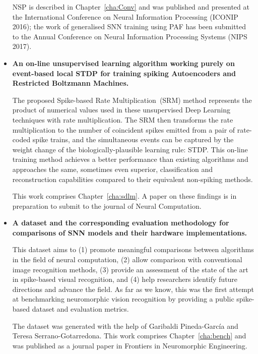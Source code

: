 \begin{itemize}
	NSP is described in Chapter~\ref{cha:Conv} and was published and presented at the International Conference on Neural Information Processing (ICONIP 2016);
	the work of generalised SNN training using PAF has been submitted to the Annual Conference on Neural Information Processing Systems (NIPS 2017).

	\item 
	\textbf{An on-line unsupervised learning algorithm working purely on event-based local STDP for training spiking Autoencoders and Restricted Boltzmann Machines.}
	
	The proposed Spike-based Rate Multiplication~(SRM) method represents the product of numerical values used in these unsupervised Deep Learning techniques with rate multiplication.
	The SRM then transforms the rate multiplication to the number of coincident spikes emitted from a pair of rate-coded spike trains, and the simultaneous events can be captured by the weight change of the biologically-plausible learning rule: STDP.
	This on-line training method achieves a better performance than existing algorithms and approaches the same, sometimes even superior, classification and reconstruction capabilities compared to their equivalent non-spiking methods.
%	
	
	This work comprises Chapter~\ref{cha:sdlm}.
	A paper on these findings is in preparation to submit to the journal of Neural Computation.
	
	\item 
	\textbf{A dataset and the corresponding evaluation methodology for comparisons of SNN models and their hardware implementations.}
	
	This dataset aims to (1) promote meaningful comparisons between algorithms in the field of neural computation, (2) allow comparison with conventional image recognition methods, (3) provide an assessment of the state of the art in spike-based visual recognition, and (4) help researchers identify future directions and advance the field.
	As far as we know, this was the first attempt at benchmarking neuromorphic vision recognition by providing a public spike-based dataset and evaluation metrics.
	
	The dataset was generated with the help of Garibaldi Pineda-Garc\'ia and Teresa Serrano-Gotarredona.
	This work comprises Chapter~\ref{cha:bench} and was published as a journal paper in Frontiers in Neuromorphic Engineering.
\end{itemize}


